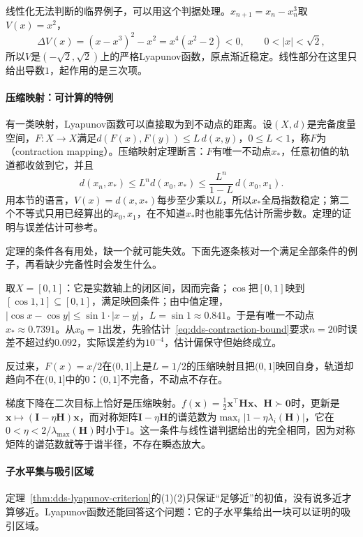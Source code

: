 线性化无法判断的临界例子，可以用这个判据处理。$x_{n+1}=x_n-x_n^3$取$V(x)=x^2$，
\[
  \Delta V(x)=(x-x^3)^2-x^2=x^4(x^2-2)<0,\qquad 0<|x|<\sqrt2 ,
\]
所以$V$是$(-\sqrt2,\sqrt2)$上的严格Lyapunov函数，原点渐近稳定。线性部分在这里只给出导数$1$，起作用的是三次项。

\paragraph{压缩映射：可计算的特例}
有一类映射，Lyapunov函数可以直接取为到不动点的距离。设$(X,d)$是完备度量空间，$F:X\to X$满足$d(F(x),F(y))\leq L\,d(x,y)$，$0\leq L<1$，称$F$为（contraction mapping）。压缩映射定理断言：$F$有唯一不动点$x_*$，任意初值的轨道都收敛到它，并且
\begin{equation}
  d(x_n,x_*)\leq L^n d(x_0,x_*)\leq\frac{L^n}{1-L}\,d(x_0,x_1).
  \label{eq:dds-contraction-bound}
\end{equation}
用本节的语言，$V(x)=d(x,x_*)$每步至少乘以$L$，所以$x_*$全局指数稳定；第二个不等式只用已经算出的$x_0,x_1$，在不知道$x_*$时也能事先估计所需步数。定理的证明与误差估计可参考。

定理的条件各有用处，缺一个就可能失效。下面先逐条核对一个满足全部条件的例子，再看缺少完备性时会发生什么。\begin{example}[余弦迭代]
\label{ex:dds-cosine-contraction}
取$X=[0,1]$：它是实数轴上的闭区间，因而完备；$\cos$把$[0,1]$映到$[\cos1,1]\subseteq[0,1]$，满足映回条件；由中值定理，$|\cos x-\cos y|\leq\sin1\cdot|x-y|$，$L=\sin1\approx0.841$。于是有唯一不动点$x_*\approx0.7391$。从$x_0=1$出发，先验估计~\eqref{eq:dds-contraction-bound}要求$n=20$时误差不超过约$0.092$，实际误差约为$10^{-4}$，估计偏保守但始终成立。
\end{example}

反过来，$F(x)=x/2$在$(0,1]$上是$L=1/2$的压缩映射且把$(0,1]$映回自身，轨道却趋向不在$(0,1]$中的$0$：$(0,1]$不完备，不动点不存在。

梯度下降在二次目标上恰好是压缩映射。$f(\bm x)=\frac12\bm x^{\top}\bm H\bm x$、$\bm H\succ\bm0$时，更新是$\bm x\mapsto(\bm I-\eta\bm H)\bm x$，而对称矩阵$\bm I-\eta\bm H$的谱范数为$\max_i|1-\eta\lambda_i(\bm H)|$，它在$0<\eta<2/\lambda_{\max}(\bm H)$时小于$1$。这一条件与线性谱判据给出的完全相同，因为对称矩阵的谱范数就等于谱半径，不存在瞬态放大。

\paragraph{子水平集与吸引区域}
定理~\ref{thm:dds-lyapunov-criterion}的(1)(2)只保证“足够近”的初值，没有说多近才算够近。Lyapunov函数还能回答这个问题：它的子水平集给出一块可以证明的吸引区域。

